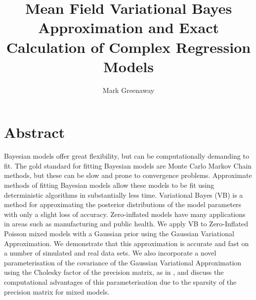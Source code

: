 \documentclass[PhD,stats]{usydthesis}[12pt]
\title{Mean Field Variational Bayes Approximation and Exact Calculation of Complex Regression Models}
\author{Mark Greenaway}
\begin{document}
\makeatletter
 
 


\makeatother

\maketitle

\tableofcontents
\listoffigures
\listoftables

\section{Abstract}
Bayesian models offer great flexibility, but can be computationally demanding to fit. The gold standard for
fitting Bayesian models are Monte Carlo Markov Chain methods, but these can be slow and prone to convergence
problems. Approximate methods of fitting Bayesian models allow these models to be fit using deterministic
algorithms in substantially less time. Variational Bayes (VB) is a method for approximating the posterior
distributions of the model parameters with only a slight loss of accuracy.  Zero-inflated models have many
applications in areas such as manufacturing and public health. We apply VB to Zero-Inflated Poisson mixed
models with a Gaussian prior using the Gaussian Variational Approximation. We demonstrate that this
approximation is accurate and fast on a number of simulated and real data sets. We also incorporate a novel
parameterisation of the covariance of the Gaussian Variational Approximation using the Cholesky factor of the
precision matrix, as in \cite{Tan2016}, and discuss the computational advantages of this parameterisation due
to the sparsity of the precision matrix for mixed models.
\end{document}
